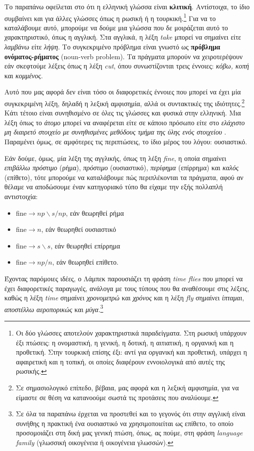 \documentclass [a4paper,11pt] {book}
\theoremstyle{definition}
\theoremstyle{definition}
\begin{document}
Το παραπάνω οφείλεται στο ότι η ελληνική γλώσσα είναι \textbf{κλιτική}. Αντίστοιχα, το ίδιο συμβαίνει και για άλλες γλώσσες όπως η ρωσική ή η τουρκική.\footnote{Οι δύο γλώσσες αποτελούν χαρακτηριστικά παραδείγματα. Στη ρωσική υπάρχουν έξι πτώσεις: η ονομαστική, η γενική, η δοτική, η αιτιατική, η οργανική και η προθετική. Στην τουρκική επίσης έξι: αντί για οργανική και προθετική, υπάρχει η αφαιρετική και η τοπική, οι οποίες διαφέρουν εννοιολογικά από αυτές της ρωσικής.} Για να το καταλάβουμε αυτό, μπορούμε να δούμε μια γλώσσα που δε μοιράζεται αυτό το χαρακτηριστικό, όπως η αγγλική. Στα αγγλικά, η λέξη \textit{take} μπορεί να σημαίνει είτε \textit{λαμβάνω} είτε \textit{λήψη}. Το συγκεκριμένο πρόβλημα είναι γνωστό ως \textbf{πρόβλημα ονόματος-ρήματος} (noun-verb problem). Τα πράγματα μπορούν να χειροτερέψουν εάν σκεφτούμε λέξεις όπως η λέξη \textit{cut}, όπου συνωστίζονται τρεις έννοιες: \textit{κόβω, κοπή} και \textit{κομμένος}.

Αυτό που μας αφορά δεν είναι τόσο οι διαφορετικές έννοιες που μπορεί να έχει μία συγκεκριμένη λέξη, δηλαδή η λεξική αμφισημία, αλλά οι συντακτικές της ιδιότητες.\footnote{Σε σημασιολογικό επίπεδο, βέβαια, μας αφορά και η λεξική αμφισημία, για να είμαστε σε θέση να κατανοούμε σωστά τις προτάσεις που αναλύουμε.} Κάτι τέτοιο είναι συνηθισμένο σε όλες τις γλώσσες και φυσικά στην ελληνική. Μια λέξη όπως το \textit{άτομο} μπορεί να αναφέρεται είτε σε κάποιο πρόσωπο είτε στο \textit{ελάχιστο μη διαιρετό στοιχείο με συνηθισμένες μεθόδους τμήμα της ύλης ενός στοιχείου} \citep{lexiko}. Παραμένει όμως, σε αμφότερες τις περιπτώσεις, το ίδιο μέρος του λόγου: ουσιαστικό.

Εάν δούμε, όμως, μία λέξη της αγγλικής, όπως τη λέξη \textit{fine}, η οποία σημαίνει \textit{επιβάλλω πρόστιμο} (ρήμα), \textit{πρόστιμο} (ουσιαστικό), \textit{περίφημα} (επίρρημα) και \textit{καλός} (επίθετο), τότε μπορούμε να καταλάβουμε πώς περιπλέκονται τα πράγματα, αφού αν θέλαμε να αποδώσουμε έναν κατηγοριακό τύπο θα είχαμε την εξής πολλαπλή αντιστοιχία:
\begin{itemize}
\item fine$\to np\backslash s/np$, εάν θεωρηθεί ρήμα
\item fine$\to n$, εάν θεωρηθεί ουσιαστικό
\item fine$\to s\backslash s$, εάν θεωρηθεί επίρρημα
\item fine$\to np/n$, εάν θεωρηθεί επίθετο.
\end{itemize}
Έχοντας παρόμοιες ιδέες, ο Λάμπεκ \citep{lamb:math58} παρουσιάζει τη φράση \textit{time flies} που μπορεί να έχει διαφορετικές παραγωγές, ανάλογα με τους τύπους που θα αναθέσουμε στις λέξεις, καθώς η λέξη \textit{time} σημαίνει \textit{χρονομετρώ} και \textit{χρόνος} και η λέξη \textit{fly} σημαίνει \textit{ίπταμαι}, \textit{αποστέλλω αεροπορικώς} και \textit{μύγα}.\footnote{Σε όλα τα παραπάνω έρχεται να προστεθεί και το γεγονός ότι στην αγγλική είναι συνήθης η πρακτική ένα ουσιαστικό να χρησιμοποιείται ως επίθετο, το οποίο προσομοιάζει στη δική μας γενική πτώση, όπως, ας πούμε, στη φράση \textit{language family} (γλωσσική οικογένεια ή οικογένεια γλωσσών).}
\end{document}

